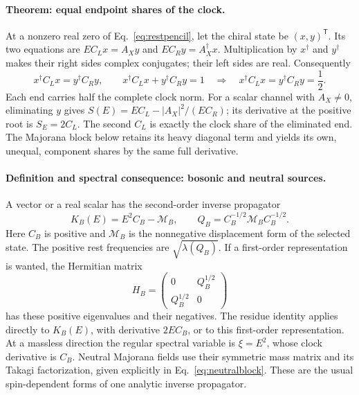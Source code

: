 \documentclass[aps,prx,onecolumn,10pt,notitlepage,nofootinbib,longbibliography]{revtex4-2}
\numberwithin{equation}{section}
\numberwithin{table}{section}
\begin{document}
\paragraph*{Theorem: equal endpoint shares of the clock.}
At a nonzero real zero of Eq.~\eqref{eq:restpencil}, let the chiral state be $(x,y)^{\mathsf T}$. Its two equations are $EC_Lx=A_Xy$ and $EC_Ry=A_X^\dagger x$. Multiplication by $x^\dagger$ and $y^\dagger$ makes their right sides complex conjugates; their left sides are real. Consequently
\begin{equation}
 x^\dagger C_Lx=y^\dagger C_Ry,\qquad
 x^\dagger C_Lx+y^\dagger C_Ry=1
 \quad\Longrightarrow\quad
 x^\dagger C_Lx=y^\dagger C_Ry=\frac12.
 \label{eq:endpointclockhalf}
\end{equation}
Each end carries half the complete clock norm. For a scalar channel with $A_X\ne0$, eliminating $y$ gives $S(E)=EC_L-|A_X|^2/(EC_R)$; its derivative at the positive root is $S_E=2C_L$. The second $C_L$ is exactly the clock share of the eliminated end. The Majorana block below retains its heavy diagonal term and yields its own, unequal, component shares by the same full derivative.

\paragraph*{Definition and spectral consequence: bosonic and neutral sources.}
A vector or a real scalar has the second-order inverse propagator
\begin{equation}
 K_B(E)=E^2C_B-\mathcal M_B,\qquad
 Q_B=C_B^{-1/2}\mathcal M_BC_B^{-1/2}.
 \label{eq:bosonblock}
\end{equation}
Here $C_B$ is positive and $\mathcal M_B$ is the nonnegative displacement form of the selected state. The positive rest frequencies are $\sqrt{\lambda(Q_B)}$. If a first-order representation is wanted, the Hermitian matrix
\begin{equation}
 H_B=\begin{pmatrix}0&Q_B^{1/2}\\Q_B^{1/2}&0\end{pmatrix}
\end{equation}
has these positive eigenvalues and their negatives. The residue identity applies directly to $K_B(E)$, with derivative $2EC_B$, or to this first-order representation. At a massless direction the regular spectral variable is $\xi=E^2$, whose clock derivative is $C_B$. Neutral Majorana fields use their symmetric mass matrix and its Takagi factorization, given explicitly in Eq.~\eqref{eq:neutralblock}. These are the usual spin-dependent forms of one analytic inverse propagator.
\end{document}

